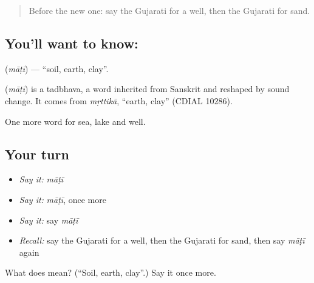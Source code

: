 \label{lesson:GU-C65-soil}



\begin{quote}
Before the new one: say the Gujarati for a well, then the Gujarati for sand.
\end{quote}

\subsection*{You'll want to know: }
\textbf{} (\emph{māṭī}) — \textquotedblleft{}soil, earth, clay\textquotedblright{}.

\begin{cousinweb}
\textbf{} (\emph{māṭī}) is a tadbhava, a word inherited from Sanskrit and reshaped by sound change. It comes from \emph{mṛttikā}, \textquotedblleft{}earth, clay\textquotedblright{} (CDIAL 10286).
\end{cousinweb}

\begin{grammarlens}[title={What you've built}]
One more word for sea, lake and well.
\end{grammarlens}

\subsection*{Your turn}
\begin{itemize}
\raggedright
  \item \emph{Say it:} \emph{māṭī}
  \item \emph{Say it:} \emph{māṭī}, once more
  \item \emph{Say it:} say \emph{māṭī}
  \item \emph{Recall:} say the Gujarati for a well, then the Gujarati for sand, then say \emph{māṭī} again
\end{itemize}

\begin{tcolorbox}[breakable,colback=teal!4,colframe=teal!35!black,title={Before you move on}]
What does  mean? (\textquotedblleft{}Soil, earth, clay\textquotedblright{}.) Say it once more.
\end{tcolorbox}

